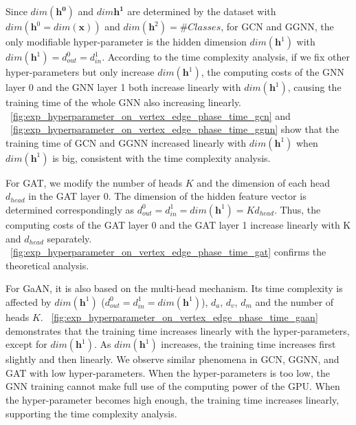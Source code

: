 Since $dim(\boldsymbol{h^0})$ and $dim{\boldsymbol{h^1}}$ are determined by the dataset with $dim(\boldsymbol{h}^0=dim(\boldsymbol{x}))$ and $dim(\boldsymbol{h}^2)=\#Classes$,
for GCN and GGNN, the only modifiable hyper-parameter is the hidden dimension $dim(\boldsymbol{h}^1)$ with $dim(\boldsymbol{h}^1) = d^0_{out} = d^1_{in}$.
According to the time complexity analysis, if we fix other hyper-parameters but only increase $dim(\boldsymbol{h}^1)$, the computing costs of the GNN layer 0 and the GNN layer 1 both increase linearly with $dim(\boldsymbol{h}^1)$, causing the training time of the whole GNN also increasing linearly. 
\figurename~\ref{fig:exp_hyperparameter_on_vertex_edge_phase_time_gcn} and \figurename~\ref{fig:exp_hyperparameter_on_vertex_edge_phase_time_ggnn} show that the training time of GCN and GGNN increased linearly with $dim(\boldsymbol{h}^1)$ when $dim(\boldsymbol{h}^1)$ is big, consistent with the time complexity analysis.

For GAT, we modify the number of heads $K$ and the dimension of each head $d_{head}$ in the GAT layer 0.
The dimension of the hidden feature vector is determined correspondingly as $d^0_{out} = d^1_{in} = dim(\boldsymbol{h}^1) = K d_{head}$.
Thus, the computing costs of the GAT layer 0 and the GAT layer 1 increase linearly with K and $d_{head}$ separately. 
\figurename~\ref{fig:exp_hyperparameter_on_vertex_edge_phase_time_gat} confirms the theoretical analysis.

For GaAN, it is also based on the multi-head mechanism.
Its time complexity is affected by $dim(\boldsymbol{h}^1)$ ($d^0_{out} = d^1_{in} = dim(\boldsymbol{h}^1)$), $d_a$, $d_v$, $d_m$ and the number of heads $K$.
\figurename~\ref{fig:exp_hyperparameter_on_vertex_edge_phase_time_gaan} demonstrates that the training time increases linearly with the hyper-parameters, except for $dim(\boldsymbol{h}^1)$.
As $dim(\boldsymbol{h}^1)$ increases, the training time increases first slightly and then linearly.
We observe similar phenomena in GCN, GGNN, and GAT with low hyper-parameters.
When the hyper-parameters is too low, the GNN training cannot make full use of the computing power of the GPU.
When the hyper-parameter becomes high enough, the training time increases linearly, supporting the time complexity analysis.

